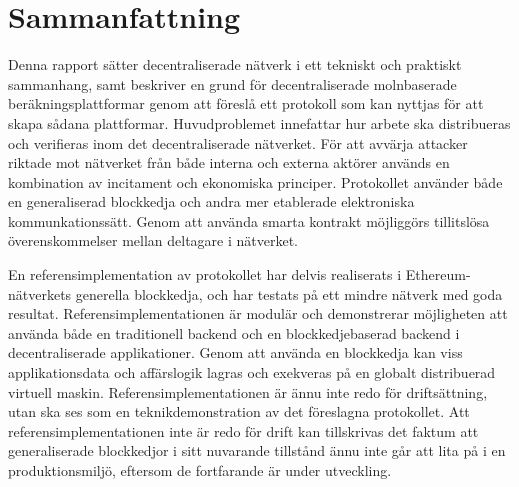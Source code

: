 
\thispagestyle{plain}			%
\section*{Sammanfattning}
Denna rapport sätter decentraliserade nätverk i ett tekniskt och praktiskt sammanhang, samt beskriver en grund för decentraliserade molnbaserade beräkningsplattformar genom att föreslå ett protokoll som kan nyttjas för att skapa sådana plattformar. Huvudproblemet innefattar hur arbete ska distribueras och verifieras inom det decentraliserade nätverket. För att avvärja attacker riktade mot nätverket från både interna och externa aktörer används en kombination av incitament och ekonomiska principer. Protokollet använder både en generaliserad blockkedja och andra mer etablerade elektroniska kommunkationssätt. Genom att använda smarta kontrakt möjliggörs tillitslösa överenskommelser mellan deltagare i nätverket.

En referensimplementation av protokollet har delvis realiserats i Ethereum-nätverkets generella blockkedja, och har testats på ett mindre nätverk med goda resultat. Referensimplementationen är modulär och demonstrerar möjligheten att använda både en traditionell backend och en blockkedjebaserad backend i decentraliserade applikationer. Genom att använda en blockkedja kan viss applikationsdata och affärslogik lagras och exekveras på en globalt distribuerad virtuell maskin. Referensimplementationen är ännu inte redo för driftsättning, utan ska ses som en teknikdemonstration av det föreslagna protokollet. Att referensimplementationen inte är redo för drift kan tillskrivas det faktum att generaliserade blockkedjor i sitt nuvarande tillstånd ännu inte går att lita på i en produktionsmiljö, eftersom de fortfarande är under utveckling.

\newpage				%
\thispagestyle{empty}
\mbox{}